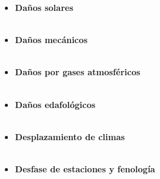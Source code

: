 \begin{itemize}[leftmargin=0cm, itemsep=0.5 cm]

\item[]\textbf{Daños solares\\}\\
\item[]\textbf{Daños mecánicos\\}\\
\item[]\textbf{Daños por gases atmosféricos\\}\\
\item[]\textbf{Daños edafológicos\\}\\
\item[]\textbf{Desplazamiento de climas\\}\\
\item[]\textbf{Desfase de estaciones y fenología\\}\\
\end{itemize}


